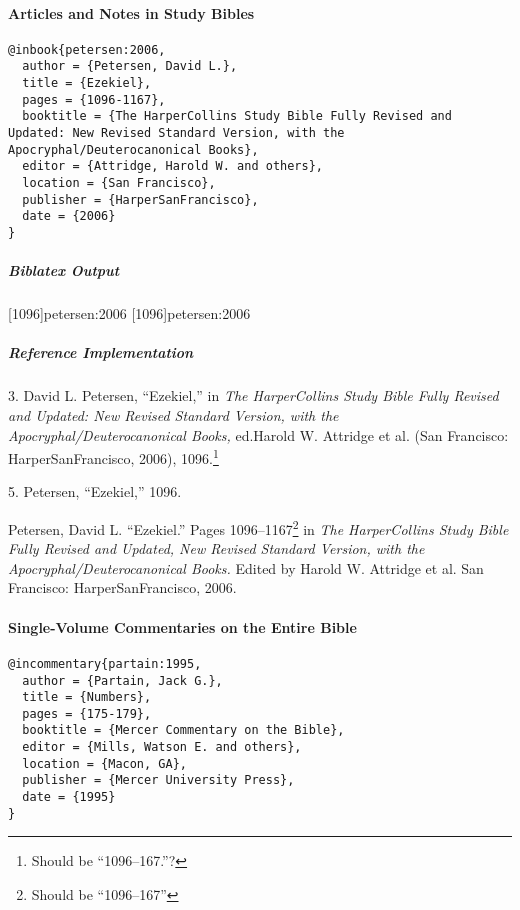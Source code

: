 \documentclass[a4paper]{article}
\newenvironment{biboutput}{%
  \subparagraph{Biblatex Output}
}{\color{black}}
\newenvironment{refimp}{%
  \subparagraph{Reference Implementation}
  \color{reference-colour}
  \rm
}{\par\color{black}}
\begin{document}
\paragraph{Articles and Notes in Study Bibles}

\begin{lstlisting}
@inbook{petersen:2006,
  author = {Petersen, David L.},
  title = {Ezekiel},
  pages = {1096-1167},
  booktitle = {The HarperCollins Study Bible Fully Revised and Updated: New Revised Standard Version, with the Apocryphal/Deuterocanonical Books},
  editor = {Attridge, Harold W. and others},
  location = {San Francisco},
  publisher = {HarperSanFrancisco},
  date = {2006}
}
\end{lstlisting}

\begin{biboutput}
  [1096]{petersen:2006}
  [1096]{petersen:2006}
\end{biboutput}

\begin{refimp}
  \hspace*{\bibindent}3. David L. Petersen, “Ezekiel,” in \emph{The
  HarperCollins Study Bible Fully Revised and Updated: New Revised Standard
  Version, with the Apocryphal\slash Deuterocanonical Books,} ed.\@ Harold W.
  Attridge et al. (San Francisco: HarperSanFrancisco, 2006),
  1096.\footnote{Should be “1096–167.”?}

  \hspace*{\bibindent}5. Petersen, “Ezekiel,” 1096.

  \hangindent\bibindent Petersen, David L. “Ezekiel.” Pages
  1096–1167\footnote{Should be “1096–167”} in \emph{The HarperCollins Study
  Bible Fully Revised and Updated, New Revised Standard Version, with the
  Apocryphal/Deuterocanonical Books.} Edited by Harold W. Attridge et al. San
  Francisco: HarperSanFrancisco, 2006.
\end{refimp}

\paragraph{Single-Volume Commentaries on the Entire Bible}

\begin{lstlisting}
@incommentary{partain:1995,
  author = {Partain, Jack G.},
  title = {Numbers},
  pages = {175-179},
  booktitle = {Mercer Commentary on the Bible},
  editor = {Mills, Watson E. and others},
  location = {Macon, GA},
  publisher = {Mercer University Press},
  date = {1995}
}
\end{lstlisting}
\end{document}
